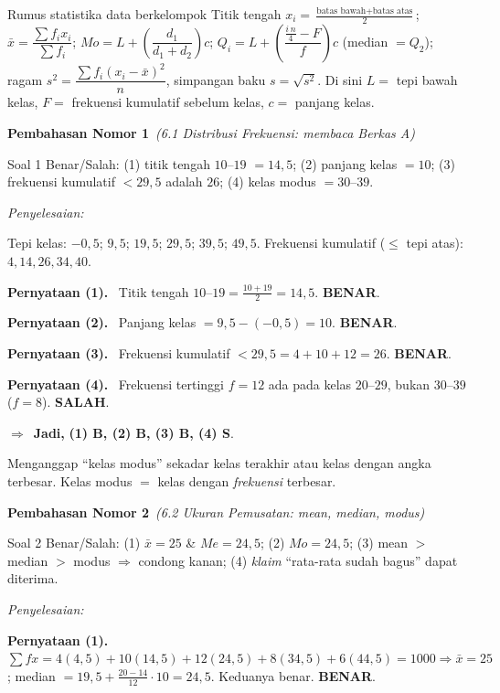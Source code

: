 \documentclass[11pt,a4paper]{article}
\newcommand{\jawab}{\par\smallskip\noindent\textit{\textcolor{oranye}{Penyelesaian:}}\par\smallskip}
\newcommand{\jadi}{\par\smallskip\noindent$\Rightarrow$\ \textbf{Jadi, }}
\newcommand{\benar}{\textbf{\textcolor{hijau}{BENAR}}}
\newcommand{\salah}{\textbf{\textcolor{merah}{SALAH}}}
\newcommand{\pernyataan}[1]{\par\smallskip\noindent\textbf{Pernyataan (#1).}\ }
\newcommand{\nomorjudul}[2]{\par\bigskip\noindent%
  {\large\bfseries\color{ungu}Pembahasan Nomor #1}\ {\normalfont\itshape\color{gray}(#2)}\par\nopagebreak\smallskip}
\begin{document}
\begin{ingat}{Rumus statistika data berkelompok}
Titik tengah $x_i=\tfrac{\text{batas bawah}+\text{batas atas}}{2}$;\quad
$\bar{x}=\dfrac{\sum f_ix_i}{\sum f_i}$;\quad
$Mo=L+\left(\dfrac{d_1}{d_1+d_2}\right)c$;\quad
$Q_i=L+\left(\dfrac{\frac{i\,n}{4}-F}{f}\right)c$ (median $=Q_2$);\quad
ragam $s^2=\dfrac{\sum f_i(x_i-\bar{x})^2}{n}$, simpangan baku $s=\sqrt{s^2}$.
Di sini $L=$ tepi bawah kelas, $F=$ frekuensi kumulatif sebelum kelas, $c=$
panjang kelas.
\end{ingat}

\nomorjudul{1}{6.1 Distribusi Frekuensi: membaca Berkas A}
\begin{soalbox}{Soal 1}
Benar/Salah: (1) titik tengah $10$--$19$ $=14{,}5$; (2) panjang kelas $=10$;
(3) frekuensi kumulatif $<29{,}5$ adalah $26$; (4) kelas modus $=30$--$39$.
\end{soalbox}

\jawab
Tepi kelas: $-0{,}5$; $9{,}5$; $19{,}5$; $29{,}5$; $39{,}5$; $49{,}5$. Frekuensi
kumulatif ($\le$ tepi atas): $4,14,26,34,40$.

\pernyataan{1} Titik tengah $10$--$19=\tfrac{10+19}{2}=14{,}5$. \benar.

\pernyataan{2} Panjang kelas $=9{,}5-(-0{,}5)=10$. \benar.

\pernyataan{3} Frekuensi kumulatif $<29{,}5=4+10+12=26$. \benar.

\pernyataan{4} Frekuensi tertinggi $f=12$ ada pada kelas $20$--$29$, bukan
$30$--$39$ ($f=8$). \salah.

\jadi \textbf{(1) B, (2) B, (3) B, (4) S}.

\begin{jebakan}
Menganggap ``kelas modus'' sekadar kelas terakhir atau kelas dengan angka
terbesar. Kelas modus $=$ kelas dengan \emph{frekuensi} terbesar.
\end{jebakan}

\nomorjudul{2}{6.2 Ukuran Pemusatan: mean, median, modus}
\begin{soalbox}{Soal 2}
Benar/Salah: (1) $\bar{x}=25$ \& $Me=24{,}5$; (2) $Mo=24{,}5$; (3) mean $>$ median
$>$ modus $\Rightarrow$ condong kanan; (4) \emph{klaim} ``rata-rata sudah bagus''
dapat diterima.
\end{soalbox}

\jawab
\pernyataan{1} $\sum fx=4(4{,}5)+10(14{,}5)+12(24{,}5)+8(34{,}5)+6(44{,}5)=1000\Rightarrow\bar{x}=25$;
median $=19{,}5+\tfrac{20-14}{12}\cdot10=24{,}5$. Keduanya benar. \benar.
\end{document}
